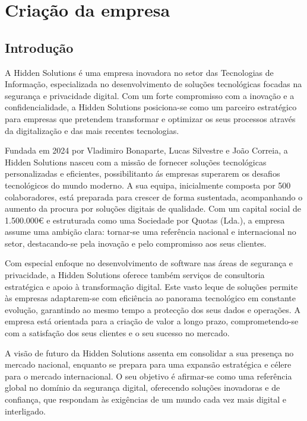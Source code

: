 \section{Criação da empresa} \label{section: Criação da empresa}
\subsection{Introdução}
\par \vspace{8pt}
A Hidden Solutions é uma empresa inovadora no setor das Tecnologias de Informação, especializada no desenvolvimento de soluções tecnológicas focadas na segurança e privacidade digital. Com um forte compromisso com a inovação e a confidencialidade, a Hidden Solutions posiciona-se como um parceiro estratégico para empresas que pretendem transformar e optimizar os seus processos através da digitalização e das mais recentes tecnologias.
\par \vspace{10pt}
Fundada em 2024 por Vladimiro Bonaparte, Lucas Silvestre e João Correia, a Hidden Solutions nasceu com a missão de fornecer soluções tecnológicas personalizadas e eficientes, possibilitanto ás empresas superarem os desafios tecnológicos do mundo moderno. A sua equipa, inicialmente composta por 500 colaboradores, está preparada para crescer de forma sustentada, acompanhando o aumento da procura por soluções digitais de qualidade. Com um capital social de 1.500.000€ e estruturada como uma Sociedade por Quotas (Lda.), a empresa assume uma ambição clara: tornar-se uma referência nacional e internacional no setor, destacando-se pela inovação e pelo compromisso aos seus clientes.
\par \vspace{10pt}
Com especial enfoque no desenvolvimento de software nas áreas de segurança e privacidade, a Hidden Solutions oferece também serviços de consultoria estratégica e apoio à transformação digital. Este vasto leque de soluções permite às empresas adaptarem-se com eficiência ao panorama tecnológico em constante evolução, garantindo ao mesmo tempo a protecção dos seus dados e operações. A empresa está orientada para a criação de valor a longo prazo, comprometendo-se com a satisfação dos seus clientes e o seu sucesso no mercado.
\par \vspace{10pt}
A visão de futuro da Hidden Solutions assenta em consolidar a sua presença no mercado nacional, enquanto se prepara para uma expansão estratégica e célere para o mercado internacional. O seu objetivo é afirmar-se como uma referência global no domínio da segurança digital, oferecendo soluções inovadoras e de confiança, que respondam às exigências de um mundo cada vez mais digital e interligado.
